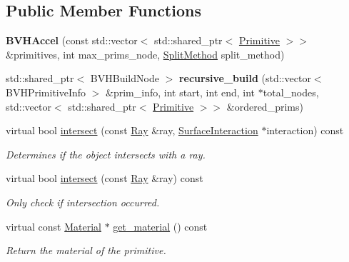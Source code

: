 \subsection*{Public Member Functions}
\begin{DoxyCompactItemize}
\item 
\mbox{\label{classomg_1_1_b_v_h_accel_aa802d0dd148e67e8b100a5254dbab42b}} 
{\bfseries B\+V\+H\+Accel} (const std\+::vector$<$ std\+::shared\+\_\+ptr$<$ \mbox{\hyperlink{classomg_1_1_primitive}{Primitive}} $>$$>$ \&primitives, int max\+\_\+prims\+\_\+node, \mbox{\hyperlink{classomg_1_1_b_v_h_accel_a76a87ca6ffce37773ad59bc4d540c33f}{Split\+Method}} split\+\_\+method)
\item 
\mbox{\label{classomg_1_1_b_v_h_accel_a965c67c0887a4b61ec822757dcae874c}} 
std\+::shared\+\_\+ptr$<$ B\+V\+H\+Build\+Node $>$ {\bfseries recursive\+\_\+build} (std\+::vector$<$ B\+V\+H\+Primitive\+Info $>$ \&prim\+\_\+info, int start, int end, int $\ast$total\+\_\+nodes, std\+::vector$<$ std\+::shared\+\_\+ptr$<$ \mbox{\hyperlink{classomg_1_1_primitive}{Primitive}} $>$$>$ \&ordered\+\_\+prims)
\item 
virtual bool \mbox{\hyperlink{classomg_1_1_b_v_h_accel_a368b5156d04fdac833f8c9917f13d91e}{intersect}} (const \mbox{\hyperlink{classomg_1_1_ray}{Ray}} \&ray, \mbox{\hyperlink{classomg_1_1_surface_interaction}{Surface\+Interaction}} $\ast$interaction) const
\begin{DoxyCompactList}\small\item\em Determines if the object intersects with a ray. \end{DoxyCompactList}\item 
virtual bool \mbox{\hyperlink{classomg_1_1_b_v_h_accel_a110cd424f8f4d628668cb500ff3c6e7a}{intersect}} (const \mbox{\hyperlink{classomg_1_1_ray}{Ray}} \&ray) const
\begin{DoxyCompactList}\small\item\em Only check if intersection occurred. \end{DoxyCompactList}\item 
virtual const \mbox{\hyperlink{classomg_1_1_material}{Material}} $\ast$ \mbox{\hyperlink{classomg_1_1_b_v_h_accel_afc47144553f2de1a23c4053e56747eee}{get\+\_\+material}} () const
\begin{DoxyCompactList}\small\item\em Return the material of the primitive. \end{DoxyCompactList}\item 

\end{DoxyCompactItemize}
